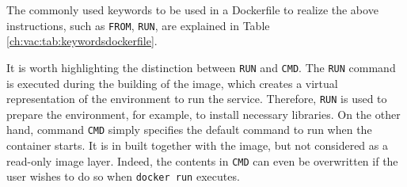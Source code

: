 The commonly used keywords to be used in a Dockerfile to realize the above instructions, such as \verb|FROM|, \verb|RUN|, are explained in Table \ref{ch:vac:tab:keywordsdockerfile}. 

It is worth highlighting the distinction between \verb|RUN| and \verb|CMD|. The \verb|RUN| command is executed during the building of the image, which creates a virtual representation of the environment to run the service. Therefore, \verb|RUN| is used to prepare the environment, for example, to install necessary libraries. On the other hand, command \verb|CMD| simply specifies the default command to run when the container starts. It is in built together with the image, but not considered as a read-only image layer. Indeed, the contents in \verb|CMD| can even be overwritten if the user wishes to do so when \verb|docker run| executes.

